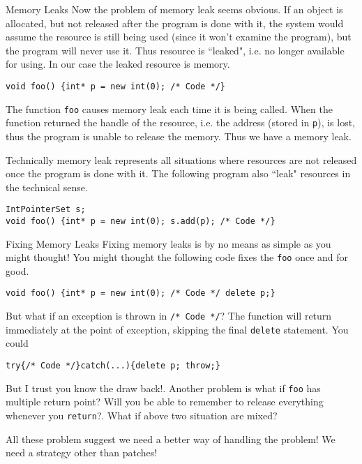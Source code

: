\begin{frame}[fragile]{Memory Leaks}
\small
Now the problem of memory leak seems obvious. If an object is allocated, but not released after the program is done with it, the system would assume the resource is still being used (since it won't examine the program), but the program will never use it. Thus resource is ``leaked", i.e. no longer available for using. In our case the leaked resource is memory. 
\begin{verbatim}
void foo() {int* p = new int(0); /* Code */}
\end{verbatim}
The function \texttt{foo} causes memory leak each time it is being called. When the function returned the handle of the resource, i.e. the address (stored in \texttt{p}), is lost, thus the program is unable to release the memory. Thus we have a memory leak. 

Technically memory leak represents all situations where resources are not released once the program is done with it. The following program also ``leak" resources in the technical sense.
\begin{verbatim}
IntPointerSet s;
void foo() {int* p = new int(0); s.add(p); /* Code */}
\end{verbatim}
\end{frame}

\begin{frame}[fragile]{Fixing Memory Leaks}
Fixing memory leaks is by no means as simple as you might thought! You might thought the following code fixes the \texttt{foo} once and for good.
\begin{verbatim}
void foo() {int* p = new int(0); /* Code */ delete p;}
\end{verbatim}
But what if an exception is thrown in \texttt{/* Code */}? The function will return immediately at the point of exception, skipping the final \texttt{delete} statement. You could
\begin{verbatim}
try{/* Code */}catch(...){delete p; throw;} 
\end{verbatim}
But I trust you know the draw back!. Another problem is what if \texttt{foo} has multiple return point? Will you be able to remember to release everything whenever you \texttt{return}?. What if above two situation are mixed? 

All these problem suggest we need a better way of handling the problem! We need a strategy other than patches!
\end{frame}

